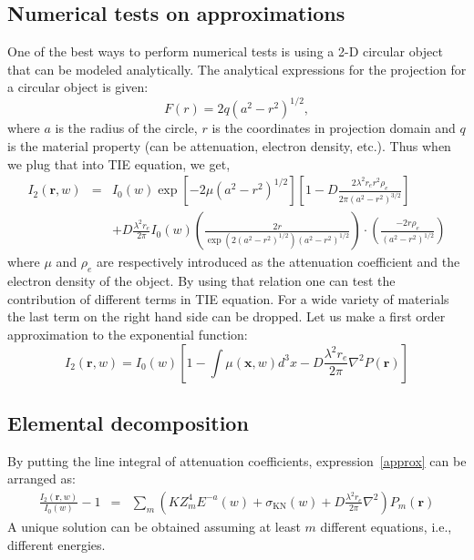 \documentclass[12pt]{article}
\begin{document}
\subsection{Numerical tests on approximations}
One of the best ways to perform numerical tests is using a 2-D circular object that can be modeled analytically. The analytical expressions for the projection for a circular object is given:
\begin{equation}
 F(r) = 2q(a^2-r^2)^{1/2},
\label{eqn:proj}
\end{equation}
where $a$ is the radius of the circle, $r$ is the coordinates in projection domain and $q$ is the material property (can be attenuation, electron density, etc.). Thus when we plug that into TIE equation, we get,
\begin{eqnarray}
I_2(\textbf{r},w)&=& I_{0}(w)\exp\left[-2\mu(a^2-r^2)^{1/2}\right]\left[1 -D\frac{2\lambda^2r_er^2\rho_e}{2\pi(a^2-r^2)^{3/2}}\right] \\
&& +D\frac{\lambda^2r_e}{2\pi}I_{0}(w)\left(\frac{2r}{\exp\left(2(a^2-r^2)^{1/2}\right)(a^2-r^2)^{1/2}}\right)\cdot \left(\frac{-2r\rho_e}{(a^2-r^2)^{1/2}}\right)\nonumber
\end{eqnarray}
where $\mu$ and $\rho_e$ are respectively introduced as the attenuation coefficient and the electron density of the object. By using that relation one can test the contribution of different terms in TIE equation.  For a wide variety of materials the last term on the right hand side can be dropped. Let us make a first order approximation to the exponential function:
\begin{equation}
  I_2(\textbf{r},w) = I_{0}(w)\left[1-\int\mu(\textbf{x},w)d^3x -D\frac{\lambda^2r_e}{2\pi}\nabla^2P(\textbf{r})\right]
 \label{approx}
\end{equation}

\subsection{Elemental decomposition}
By putting the line integral of attenuation coefficients, expression~\ref{approx} can be arranged as:
\begin{eqnarray}
\frac{I_2(\textbf{r},w)}{I_{0}(w)}-1 &=&  \sum_m \left( KZ_m^4E^{-a}(w)+\sigma_{\text{KN}}(w) +D\frac{\lambda^2r_e}{2\pi}\nabla^2\right)P_m(\textbf{r})
\end{eqnarray}
A unique solution can be obtained assuming at least $m$ different equations, i.e., different energies. 
\end{document}
